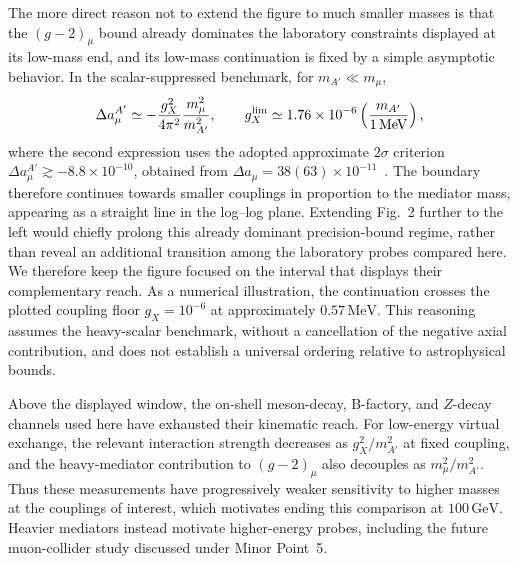 \documentclass[12pt,a4paper]{article}
\begin{document}
The more direct reason not to extend the figure to much smaller masses is that the \((g-2)_\mu\) bound already dominates the laboratory constraints displayed at its low-mass end, and its low-mass continuation is fixed by a simple asymptotic behavior. In the scalar-suppressed benchmark, for \(m_{A'}\ll m_\mu\),
\[
\Delta a_\mu^{A'}\simeq-\frac{g_X^2}{4\pi^2}\frac{m_\mu^2}{m_{A'}^2},
\qquad
g_X^{\rm lim}\simeq1.76\times10^{-6}\left(\frac{m_{A'}}{1\,\mathrm{MeV}}\right),
\]
where the second expression uses the adopted approximate \(2\sigma\) criterion \(\Delta a_\mu^{A'}\gtrsim-8.8\times10^{-10}\), obtained from \(\Delta a_\mu=38(63)\times10^{-11}\)~\cite{Leveille:1977rc,Muong-2:2025xyk,Aliberti:2025beg}. The boundary therefore continues towards smaller couplings in proportion to the mediator mass, appearing as a straight line in the log--log plane. Extending Fig.~2 further to the left would chiefly prolong this already dominant precision-bound regime, rather than reveal an additional transition among the laboratory probes compared here. We therefore keep the figure focused on the interval that displays their complementary reach. As a numerical illustration, the continuation crosses the plotted coupling floor \(g_X=10^{-6}\) at approximately \(0.57\,\mathrm{MeV}\). This reasoning assumes the heavy-scalar benchmark, without a cancellation of the negative axial contribution, and does not establish a universal ordering relative to astrophysical bounds.

\medskip
{}

Above the displayed window, the on-shell meson-decay, B-factory, and \(Z\)-decay channels used here have exhausted their kinematic reach. For low-energy virtual exchange, the relevant interaction strength decreases as \(g_X^2/m_{A'}^2\) at fixed coupling, and the heavy-mediator contribution to \((g-2)_\mu\) also decouples as \(m_\mu^2/m_{A'}^2\). Thus these measurements have progressively weaker sensitivity to higher masses at the couplings of interest, which motivates ending this comparison at \(100\,\mathrm{GeV}\). Heavier mediators instead motivate higher-energy probes, including the future muon-collider study discussed under Minor Point~5.

\medskip
{}
\end{document}
